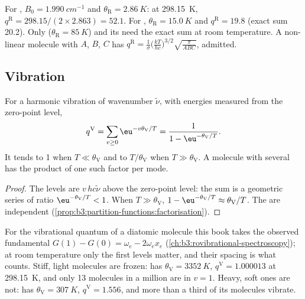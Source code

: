 For , $B_0 = \qty{1.990}{cm^{-1}}$ and $\theta_{\mathrm R} = \qty{2.86}{K}$: at \qty{298.15}{K},
$q^{\mathrm R} = 298.15/(2\times2.863) = 52.1$. For , $\theta_{\mathrm R} = \qty{15.0}{K}$ and
$q^{\mathrm R} = 19.8$ (exact sum 20.2). Only  ($\theta_{\mathrm R} = \qty{85}{K}$) and its 
need the exact sum at room temperature. A non-linear molecule with  $A$, $B$, $C$ has $q^{\mathrm R} = \frac{1}{\sigma}\bigl(\frac{kT}{hc}\bigr)^{3/2}\sqrt{\frac{\pi}{ABC}}$, admitted.

\subsection*{Vibration}

\begin{proposition}\label{prop:b3:partition-functions:q-vib}
For a harmonic vibration of wavenumber $\tilde\nu$, with energies measured from the
zero-point level,
\[
  q^{\mathrm V} = \sum_{v\ge0}\eu^{-v\theta_{\mathrm V}/T} = \frac{1}{1 - \eu^{-\theta_{\mathrm V}/T}} .
\]
It tends to 1 when $T \ll \theta_{\mathrm V}$ and to $T/\theta_{\mathrm V}$ when $T \gg \theta_{\mathrm V}$. A molecule
with several  has the product of one such factor per mode.
\end{proposition}

\begin{proof}
The levels are $v\,hc\tilde\nu$ above the zero-point level: the sum is a geometric series
of ratio $\eu^{-\theta_{\mathrm V}/T} < 1$. When $T \gg \theta_{\mathrm V}$, $1 - \eu^{-\theta_{\mathrm V}/T} \approx \theta_{\mathrm V}/T$.
The  are independent (\cref{prop:b3:partition-functions:factorisation}).
\end{proof}

For the vibrational quantum of a diatomic molecule this book takes the
observed fundamental $G(1) - G(0) = \omega_e - 2\omega_ex_e$
(\cref{ch:b3:rovibrational-spectroscopy}); at room temperature only the first
levels matter, and their spacing is what counts. Stiff, light molecules are
frozen:  has $\theta_{\mathrm V} = \qty{3352}{K}$, $q^{\mathrm V} = 1.000013$ at \qty{298.15}{K}, and
only 13 molecules in a million are in $v = 1$. Heavy, soft ones are not: 
has $\theta_{\mathrm V} = \qty{307}{K}$, $q^{\mathrm V} = 1.556$, and more than a third of its molecules
vibrate.

